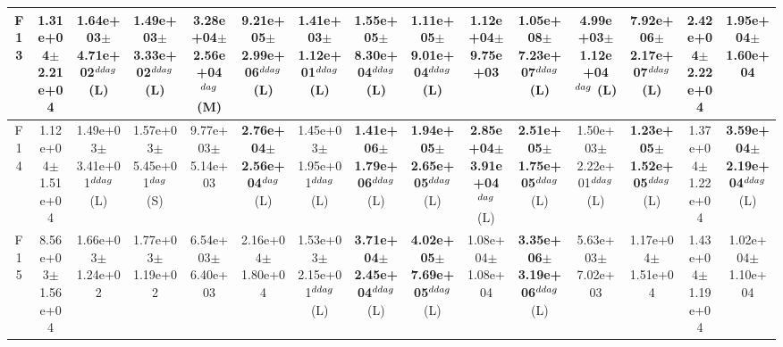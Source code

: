 \begin{table}[!t]
\begin{tabular}{c|cccccccccccccc}
F13  & 1.31e+04$\pm$2.21e+04  & 1.64e+03$\pm$4.71e+02$^{\\ddag}$ (L)  & 1.49e+03$\pm$3.33e+02$^{\\ddag}$ (L)  & \textbf{3.28e+04$\pm$2.56e+04}$^{\\dag}$ (M)  & \textbf{9.21e+05$\pm$2.99e+06}$^{\\ddag}$ (L)  & 1.41e+03$\pm$1.12e+01$^{\\ddag}$ (L)  & \textbf{1.55e+05$\pm$8.30e+04}$^{\\ddag}$ (L)  & \textbf{1.11e+05$\pm$9.01e+04}$^{\\ddag}$ (L)  & 1.12e+04$\pm$9.75e+03   & \textbf{1.05e+08$\pm$7.23e+07}$^{\\ddag}$ (L)  & 4.99e+03$\pm$1.12e+04$^{\\dag}$ (L)  & \textbf{7.92e+06$\pm$2.17e+07}$^{\\ddag}$ (L)  & 2.42e+04$\pm$2.22e+04   & 1.95e+04$\pm$1.60e+04  \\ \hline
F14  & 1.12e+04$\pm$1.51e+04  & 1.49e+03$\pm$3.41e+01$^{\\ddag}$ (L)  & 1.57e+03$\pm$5.45e+01$^{\\dag}$ (S)  & 9.77e+03$\pm$5.14e+03   & \textbf{2.76e+04$\pm$2.56e+04}$^{\\dag}$ (L)  & 1.45e+03$\pm$1.95e+01$^{\\ddag}$ (L)  & \textbf{1.41e+06$\pm$1.79e+06}$^{\\ddag}$ (L)  & \textbf{1.94e+05$\pm$2.65e+05}$^{\\ddag}$ (L)  & \textbf{2.85e+04$\pm$3.91e+04}$^{\\dag}$ (L)  & \textbf{2.51e+05$\pm$1.75e+05}$^{\\ddag}$ (L)  & 1.50e+03$\pm$2.22e+01$^{\\ddag}$ (L)  & \textbf{1.23e+05$\pm$1.52e+05}$^{\\ddag}$ (L)  & 1.37e+04$\pm$1.22e+04   & \textbf{3.59e+04$\pm$2.19e+04}$^{\\ddag}$ (L) \\ \hline
F15  & 8.56e+03$\pm$1.56e+04  & 1.66e+03$\pm$1.24e+02   & 1.77e+03$\pm$1.19e+02   & 6.54e+03$\pm$6.40e+03   & 2.16e+04$\pm$1.80e+04   & 1.53e+03$\pm$2.15e+01$^{\\ddag}$ (L)  & \textbf{3.71e+04$\pm$2.45e+04}$^{\\ddag}$ (L)  & \textbf{4.02e+05$\pm$7.69e+05}$^{\\ddag}$ (L)  & 1.08e+04$\pm$1.08e+04   & \textbf{3.35e+06$\pm$3.19e+06}$^{\\ddag}$ (L)  & 5.63e+03$\pm$7.02e+03   & 1.17e+04$\pm$1.51e+04   & 1.43e+04$\pm$1.19e+04   & 1.02e+04$\pm$1.10e+04  \\ \hline

\end{tabular}
\end{table}
